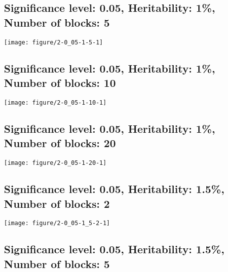 \documentclass[11pt,letter]{article}\usepackage[]{graphicx}\usepackage[]{color}
\makeatletter
\def\maxwidth{ %
  \ifdim\Gin@nat@width>\linewidth
    \linewidth
  \else
    \Gin@nat@width
  \fi
}
\newenvironment{knitrout}{}{} %
\makeatother
\begin{document}
\newpage
\subsection{Significance level: 0.05, Heritability: 1\%, Number of blocks: 5}

\begin{knitrout}
\color{fgcolor}
\texttt{[image: figure/2-0\_05-1-5-1]} 

\end{knitrout}

\newpage
\subsection{Significance level: 0.05, Heritability: 1\%, Number of blocks: 10}

\begin{knitrout}
\color{fgcolor}
\texttt{[image: figure/2-0\_05-1-10-1]} 

\end{knitrout}

\newpage
\subsection{Significance level: 0.05, Heritability: 1\%, Number of blocks: 20}

\begin{knitrout}
\color{fgcolor}
\texttt{[image: figure/2-0\_05-1-20-1]} 

\end{knitrout}

\newpage
\subsection{Significance level: 0.05, Heritability: 1.5\%, Number of blocks: 2}

\begin{knitrout}
\color{fgcolor}
\texttt{[image: figure/2-0\_05-1\_5-2-1]} 

\end{knitrout}

\newpage
\subsection{Significance level: 0.05, Heritability: 1.5\%, Number of blocks: 5}
\end{document}
